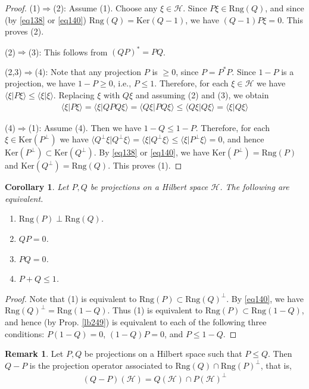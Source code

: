 \documentclass[12pt,b5paper,notitlepage]{article}
\theoremstyle{definition}
\newtheorem{rem}[df]{Remark}
\theoremstyle{plain}
\newtheorem{co}[df]{Corollary}
\newcommand{\bk}[1]{\langle {#1}\rangle}
\newcommand{\Ker}{\mathrm{Ker}}
\newcommand{\Rng}{\mathrm{Rng}}
\newcommand{\MH}{\mathcal H}
\numberwithin{equation}{section}
\begin{document}
\begin{proof}
(1)$\Rightarrow$(2): Assume (1). Choose any $\xi\in\MH$. Since $P\xi\in \Rng(Q)$, and since (by \eqref{eq138} or \eqref{eq140}) $\Rng(Q)=\Ker(Q-1)$, we have $(Q-1)P\xi=0$. This proves (2).

(2)$\Rightarrow$(3): This follows from $(QP)^*=PQ$.

(2,3)$\Rightarrow$(4): Note that any projection $P$ is $\geq0$, since $P=P^*P$. Since $1-P$ is a projection, we have $1-P\geq0$, i.e., $P\leq 1$. Therefore, for each $\xi\in\MH$ we have $\bk{\xi|P\xi}\leq\bk{\xi|\xi}$. Replacing $\xi$ with $Q\xi$ and assuming (2) and (3), we obtain
\begin{align*}
\bk{\xi|P\xi}=\bk{\xi|QPQ\xi}=\bk{Q\xi|PQ\xi}\leq\bk{Q\xi|Q\xi}=\bk{\xi|Q\xi}
\end{align*} 

(4)$\Rightarrow$(1): Assume (4). Then we have $1-Q\leq 1-P$. Therefore, for each $\xi\in\Ker(P^\perp)$ we have $\bk{Q^\perp\xi|Q^\perp\xi}=\bk{\xi|Q^\perp\xi}\leq\bk{\xi|P^\perp\xi}=0$, and hence $\Ker(P^\perp)\subset\Ker(Q^\perp)$. By \eqref{eq138} or \eqref{eq140}, we have $\Ker(P^\perp)=\Rng(P)$ and $\Ker(Q^\perp)=\Rng(Q)$. This proves (1).
\end{proof}

\begin{co}
Let $P,Q$ be projections on a Hilbert space $\MH$. The following are equivalent.
\begin{enumerate}[label=(\arabic*)]
\item $\Rng(P)\perp\Rng(Q)$.
\item $QP=0$.
\item $PQ=0$. 
\item $P+Q\leq 1$.
\end{enumerate}
\end{co}

\begin{proof}
Note that (1) is equivalent to $\Rng(P)\subset\Rng(Q)^\perp$. By \eqref{eq140}, we have $\Rng(Q)^\perp=\Rng(1-Q)$. Thus (1) is equivalent to $\Rng(P)\subset\Rng(1-Q)$, and hence (by Prop. \ref{lb249}) is equivalent to each of the following three conditions: $P(1-Q)=0$,  $(1-Q)P=0$, and $P\leq 1-Q$.
\end{proof}




\begin{rem}
Let $P,Q$ be projections on a Hilbert space such that $P\leq Q$. Then $Q-P$ is the projection operator associated to $\Rng(Q)\cap\Rng(P)^\perp$, that is,
\begin{align*}
(Q-P)(\MH)=Q(\MH)\cap P(\MH)^\perp
\end{align*}
\end{rem}
\end{document}

